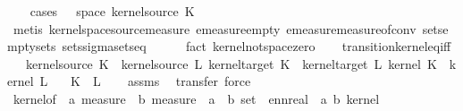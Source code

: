 \begin{isabellebody}
%
\isadelimproof
\ \ %
\endisadelimproof
%
\isatagproof
{}\isamarkupfalse%
\ {\isacharparenleft}{\kern0pt}cases\ {\isachardoublequoteopen}{\isasymomega}\ {\isasymin}\ space\ {\isacharparenleft}{\kern0pt}kernel{\isacharunderscore}{\kern0pt}source\ K{\isacharparenright}{\kern0pt}{\isachardoublequoteclose}{\isacharparenright}{\kern0pt}\isanewline
\ \ \ \ \isamarkupfalse%
\ {\isacharparenleft}{\kern0pt}metis\ kernel{\isachardot}{\kern0pt}space{\isacharunderscore}{\kern0pt}source{\isacharunderscore}{\kern0pt}measure\ emeasure{\isacharunderscore}{\kern0pt}empty\ emeasure{\isacharunderscore}{\kern0pt}measure{\isacharunderscore}{\kern0pt}of{\isacharunderscore}{\kern0pt}conv\ sets{\isachardot}{\kern0pt}empty{\isacharunderscore}{\kern0pt}sets\ sets{\isachardot}{\kern0pt}sigma{\isacharunderscore}{\kern0pt}sets{\isacharunderscore}{\kern0pt}eq{\isacharparenright}{\kern0pt}\isanewline
\ \ \ \ \isamarkupfalse%
\ {\isacharparenleft}{\kern0pt}fact\ kernel{\isacharunderscore}{\kern0pt}not{\isacharunderscore}{\kern0pt}space{\isacharunderscore}{\kern0pt}zero{\isacharparenright}{\kern0pt}\isanewline
\ \ \isamarkupfalse%
%
\endisatagproof
{\isafoldproof}%
%
\isadelimproof
\isanewline
%
\endisadelimproof
\isanewline
{}\isamarkupfalse%
\ transition{\isacharunderscore}{\kern0pt}kernel{\isacharunderscore}{\kern0pt}eq{\isacharunderscore}{\kern0pt}iff{\isacharcolon}{\kern0pt}\isanewline
\ \ \ {\isachardoublequoteopen}kernel{\isacharunderscore}{\kern0pt}source\ K\ {\isacharequal}{\kern0pt}\ kernel{\isacharunderscore}{\kern0pt}source\ L{\isachardoublequoteclose}\ {\isachardoublequoteopen}kernel{\isacharunderscore}{\kern0pt}target\ K\ {\isacharequal}{\kern0pt}\ kernel{\isacharunderscore}{\kern0pt}target\ L{\isachardoublequoteclose}\ {\isachardoublequoteopen}kernel\ K\ {\isacharequal}{\kern0pt}\ kernel\ L{\isachardoublequoteclose}\isanewline
\ \ \ {\isachardoublequoteopen}K\ {\isacharequal}{\kern0pt}\ L{\isachardoublequoteclose}\isanewline
%
\isadelimproof
\ \ %
\endisadelimproof
%
\isatagproof
{}\isamarkupfalse%
\ assms\ \isamarkupfalse%
\ {\isacharparenleft}{\kern0pt}transfer{\isacharcomma}{\kern0pt}\ force{\isacharparenright}{\kern0pt}%
\endisatagproof
{\isafoldproof}%
%
\isadelimproof
\isanewline
%
\endisadelimproof
\isanewline
{}\isamarkupfalse%
\ kernel{\isacharunderscore}{\kern0pt}of\ {\isacharcolon}{\kern0pt}{\isacharcolon}{\kern0pt}\ {\isachardoublequoteopen}{\isacharprime}{\kern0pt}a\ measure\ {\isasymRightarrow}\ {\isacharprime}{\kern0pt}b\ measure\ {\isasymRightarrow}\ {\isacharparenleft}{\kern0pt}{\isacharprime}{\kern0pt}a\ {\isasymRightarrow}\ {\isacharprime}{\kern0pt}b\ set\ {\isasymRightarrow}\ ennreal{\isacharparenright}{\kern0pt}\ {\isasymRightarrow}\ {\isacharparenleft}{\kern0pt}{\isacharprime}{\kern0pt}a{\isacharcomma}{\kern0pt}\ {\isacharprime}{\kern0pt}b{\isacharparenright}{\kern0pt}\ kernel{\isachardoublequoteclose}\isanewline

\end{isabellebody}
